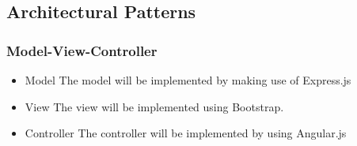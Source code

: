 \subsection{Architectural Patterns}
\subsubsection{Model-View-Controller}
\begin{itemize}
	\item{Model}
	\newline
	The model will be implemented by making use of Express.js
	\item{View}
	\newline
	The view will be implemented using Bootstrap.
	\item{Controller}
	\newline
	The controller will be implemented by using Angular.js
\end{itemize}